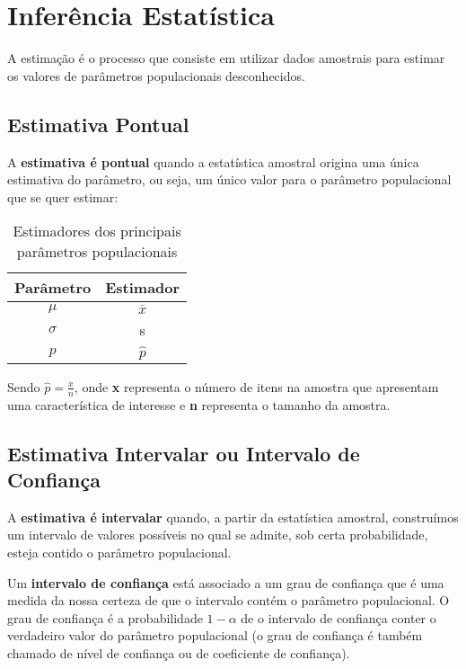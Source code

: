 \chapter{Inferência Estatística}

A estimação é o processo que consiste em utilizar dados amostrais para estimar os valores de parâmetros populacionais desconhecidos. 

\section{Estimativa Pontual}

A \textbf{estimativa é pontual} quando a estatística amostral origina uma única estimativa do parâmetro, ou seja, um único valor para o parâmetro populacional que se quer estimar:

\begin{table}[h]
	\centering	
	\caption{Estimadores dos principais parâmetros populacionais}
	\label{tab:estimadores}
	\begin{tabular}{c|c} 
		Parâmetro	& Estimador	\\
		\hline
		\(\mu\)	& \( \bar{x} \)	\\			
		\(\sigma\) & s		\\
		\( p \)	& \( \hat{p} \)		
	\end{tabular}
\end{table}

Sendo \(\hat{p} = \frac{x}{n}\), onde \textbf{x} representa o número de itens na amostra que apresentam uma característica de interesse e \textbf{n} representa o tamanho da amostra.


\section{Estimativa Intervalar ou Intervalo de Confiança}

A \textbf{estimativa é intervalar} quando, a partir da estatística amostral, construímos um intervalo de valores possíveis no qual se admite, sob certa probabilidade, esteja contido o parâmetro populacional.

Um \textbf{intervalo de confiança} está associado a um grau de confiança que é uma
medida da nossa certeza de que o intervalo contém o parâmetro populacional. O grau de confiança é a probabilidade \(1 - \alpha\) de o intervalo de confiança conter o verdadeiro valor do parâmetro populacional (o grau de confiança é também chamado de nível de confiança ou de coeficiente de confiança).

